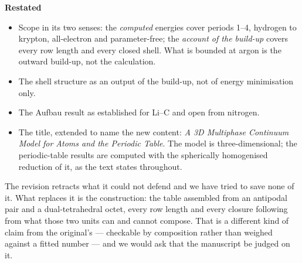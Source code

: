 \documentclass[11pt,a4paper]{article}
\begin{document}
\textbf{Restated}
\begin{itemize}
  \item Scope in its two senses: the \emph{computed} energies cover periods 1--4, hydrogen to krypton,
    all-electron and parameter-free; the \emph{account of the build-up} covers every row length and every
    closed shell. What is bounded at argon is the outward build-up, not the calculation.
  \item The shell structure as an output of the build-up, not of energy minimisation only.
  \item The Aufbau result as established for Li--C and open from nitrogen.
  \item The title, extended to name the new content: \emph{A 3D Multiphase Continuum Model for Atoms and the Periodic Table}. The model is three-dimensional; the periodic-table results are computed with the
    spherically homogenised reduction of it, as the text states throughout.
\end{itemize}

The revision retracts what it could not defend and we have tried to save none of it. What replaces it
is the construction: the table assembled from an antipodal pair and a dual-tetrahedral octet, every
row length and every closure following from what those two units can and cannot compose. That is a
different kind of claim from the original's --- checkable by composition rather than weighed against a
fitted number --- and we would ask that the manuscript be judged on it.
\end{document}
